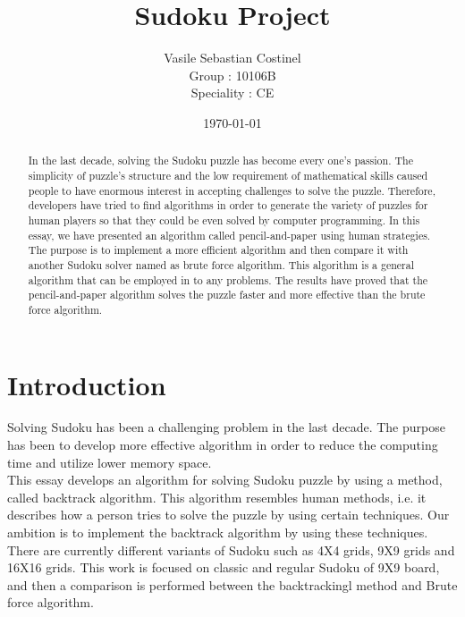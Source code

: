 \documentclass[12pt, letterpaper]{article}
\title{Sudoku Project}
\author{Vasile Sebastian Costinel \\ Group : 10106B \\ Speciality : CE}
\date{\today}
\begin{document}
\begin{titlepage}
\maketitle

\end{titlepage}
    \begin{abstract}
    In the last decade, solving the Sudoku puzzle has become every one’s
    passion. The simplicity of puzzle’s structure and the low requirement
    of mathematical skills caused people to have enormous interest in
    accepting challenges to solve the puzzle. Therefore, developers have
    tried to find algorithms in order to generate the variety of puzzles for
    human players so that they could be even solved by computer
    programming. In this essay, we have presented an algorithm called
    pencil-and-paper using human strategies. The purpose is to implement
    a more efficient algorithm and then compare it with another Sudoku
    solver named as brute force algorithm. This algorithm is a general
    algorithm that can be employed in to any problems. The results have
    proved that the pencil-and-paper algorithm solves the puzzle faster
    and more effective than the brute force algorithm.
    \end{abstract}

    \newpage

    \section{Introduction}
    \hspace{5pt}\relax Solving Sudoku has been a challenging problem in the last decade. The purpose has been to develop more effective algorithm in order to reduce the computing time and utilize lower  memory space. \\ This essay develops an algorithm for solving Sudoku puzzle by using a method, called backtrack algorithm. This algorithm resembles human methods, i.e. it describes how a person tries to solve the puzzle by using certain techniques. Our ambition is to implement the backtrack algorithm by using these techniques. There are currently different variants of Sudoku such as 4X4 grids, 9X9 grids and 16X16 grids. This work is focused on classic and regular Sudoku of 9X9 board, and then a comparison is performed between the backtrackingl method and Brute force algorithm.
\end{document}
